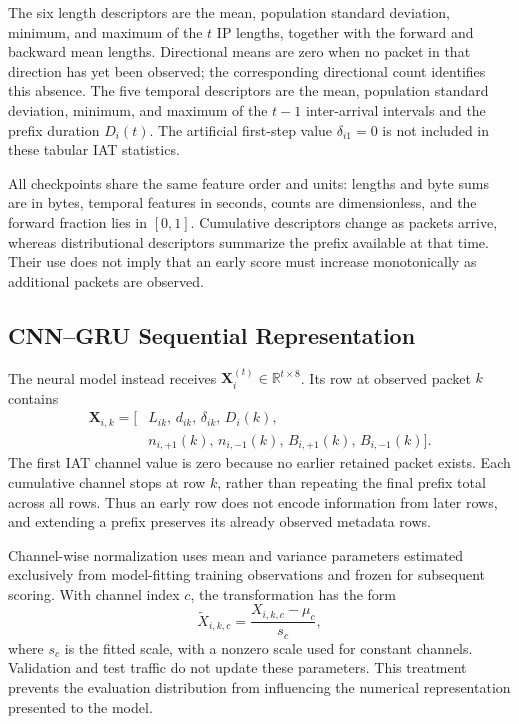 \documentclass[conference]{IEEEtran}
\begin{document}
The six length descriptors are the mean, population standard deviation, minimum, and maximum of the $t$ IP lengths, together with the forward and backward mean lengths. Directional means are zero when no packet in that direction has yet been observed; the corresponding directional count identifies this absence. The five temporal descriptors are the mean, population standard deviation, minimum, and maximum of the $t-1$ inter-arrival intervals and the prefix duration $D_i(t)$. The artificial first-step value $\delta_{i1}=0$ is not included in these tabular IAT statistics.

All checkpoints share the same feature order and units: lengths and byte sums are in bytes, temporal features in seconds, counts are dimensionless, and the forward fraction lies in $[0,1]$. Cumulative descriptors change as packets arrive, whereas distributional descriptors summarize the prefix available at that time. Their use does not imply that an early score must increase monotonically as additional packets are observed.

\subsection{CNN--GRU Sequential Representation}
The neural model instead receives $\mathbf{X}_i^{(t)}\in\mathbb{R}^{t\times8}$. Its row at observed packet $k$ contains
\begin{equation}
\begin{aligned}
\mathbf{X}_{i,k}=\big[&
L_{ik},\,d_{ik},\,\delta_{ik},\,D_i(k),\\
&n_{i,+1}(k),\,n_{i,-1}(k),\,
B_{i,+1}(k),\,B_{i,-1}(k)\big].
\end{aligned}
\label{eq:sequence_channels}
\end{equation}
The first IAT channel value is zero because no earlier retained packet exists. Each cumulative channel stops at row $k$, rather than repeating the final prefix total across all rows. Thus an early row does not encode information from later rows, and extending a prefix preserves its already observed metadata rows.

Channel-wise normalization uses mean and variance parameters estimated exclusively from model-fitting training observations and frozen for subsequent scoring. With channel index $c$, the transformation has the form
\begin{equation}
\widetilde{X}_{i,k,c}
=\frac{X_{i,k,c}-\mu_c}{s_c},
\label{eq:normalization}
\end{equation}
where $s_c$ is the fitted scale, with a nonzero scale used for constant channels. Validation and test traffic do not update these parameters. This treatment prevents the evaluation distribution from influencing the numerical representation presented to the model.
\end{document}
